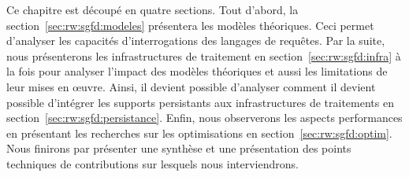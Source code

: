 Ce chapitre est découpé en quatre sections. Tout d'abord, la section~\ref{sec:rw:sgfd:modeles} présentera les modèles théoriques. Ceci permet d'analyser les capacités d'interrogations des langages de requêtes. Par la suite, nous présenterons les infrastructures de traitement en section~\ref{sec:rw:sgfd:infra} à la fois pour analyser l'impact des modèles théoriques et aussi les limitations de leur mises en œuvre. Ainsi, il devient possible d'analyser comment il devient possible d'intégrer les supports persistants aux infrastructures de traitements en section~\ref{sec:rw:sgfd:persistance}. Enfin, nous observerons les aspects performances en présentant les recherches sur les optimisations en section~\ref{sec:rw:sgfd:optim}. Nous finirons par présenter une synthèse et une présentation des points techniques de contributions sur lesquels nous interviendrons.







